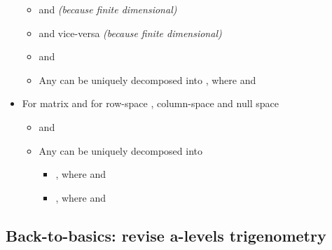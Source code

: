 \begin{itemize}
  \begin{itemize}
  
  \item
     and
     \emph{(because finite dimensional)}
  \item
     and vice-versa \emph{(because
    finite dimensional)}
  \item
     and
  \item
    Any  can be uniquely decomposed
    into , where
     and
  \end{itemize}
\item
  For matrix  and for row-space
  , column-space  and null
  space 

  \begin{itemize}
  
  \item
     and
  \item
    Any  can be uniquely decomposed
    into

    \begin{itemize}
    
    \item
      , where
       and
    \item
      , where
       and
    \end{itemize}
  \end{itemize}
\end{itemize}

\subsection*{Back-to-basics: revise a-levels
trigenometry}

